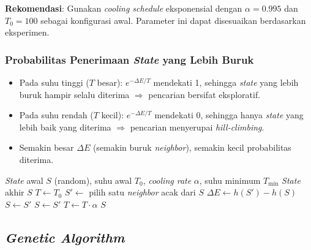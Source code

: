 \documentclass[12pt,a4paper]{article}
\begin{document}
\textbf{Rekomendasi}: Gunakan \textit{cooling schedule} eksponensial dengan $\alpha = 0.995$ dan $T_0 = 100$ sebagai konfigurasi awal. Parameter ini dapat disesuaikan berdasarkan eksperimen.

\subsubsection{Probabilitas Penerimaan \textit{State} yang Lebih Buruk}
\label{subsubsec:prob-accept}

\begin{itemize}
    \item Pada suhu tinggi ($T$ besar): $e^{-\Delta E / T}$ mendekati 1, sehingga \textit{state} yang lebih buruk hampir selalu diterima $\Rightarrow$ pencarian bersifat eksploratif.
    \item Pada suhu rendah ($T$ kecil): $e^{-\Delta E / T}$ mendekati 0, sehingga hanya \textit{state} yang lebih baik yang diterima $\Rightarrow$ pencarian menyerupai \textit{hill-climbing}.
    \item Semakin besar $\Delta E$ (semakin buruk \textit{neighbor}), semakin kecil probabilitas diterima.
\end{itemize}

\begin{algorithm}[H]
\caption{\textit{Simulated Annealing} untuk N-Queens}
\label{alg:sa}
\begin{algorithmic}[1]
\Require \textit{State} awal $S$ (random), suhu awal $T_0$, \textit{cooling rate} $\alpha$, suhu minimum $T_{\min}$
\Ensure \textit{State} akhir $S$
\State $T \leftarrow T_0$
    \State $S' \leftarrow$ pilih satu \textit{neighbor} acak dari $S$
    \State $\Delta E \leftarrow h(S') - h(S)$
        \State $S \leftarrow S'$ 
        \State $S \leftarrow S'$ 
    \EndIf
    \State $T \leftarrow T \cdot \alpha$ 
\EndWhile
\State \Return $S$
\end{algorithmic}
\end{algorithm}

\subsection{\textit{Genetic Algorithm}}
\label{subsec:genetic-algorithm}
\end{document}
